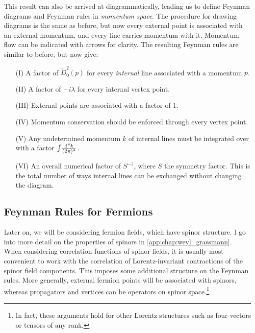\documentclass[../main.tex]{subfiles}
\begin{document}
This result can also be arrived at diagrammatically, leading us to define Feynman diagrams and Feynman rules in \emph{momentum space}.
The procedure for drawing diagrams is the same as before, but now every external point is associated with an external momentum, and every line carries momentum with it.
Momentum flow can be indicated with arrows for clarity.
The resulting Feynman rules are similar to before, but now give:
\begin{itemize}
  \item [(I)] A factor of \(\tilde{D}_0^2(p)\) for every \emph{internal} line associated with a momentum \(p\).
  \item [(II)] A factor of \(-i\lambda\) for every internal vertex point.
  \item [(III)] External points are associated with a factor of \(1\).
  \item [(IV)] Momentum conservation should be enforced through every vertex point.
  \item [(V)] Any undetermined momentum \(k\) of internal lines must be integrated over with a factor \(\int\!\frac{\mathrm{d}^{4}k}{(2\pi)^{4}}\,\).
  \item [(VI)] An overall numerical factor of \(S^{-1}\), where \(S\) the symmetry factor. This is the total number of ways internal lines can be exchanged without changing the diagram.
\end{itemize}


\subsection{Feynman Rules for Fermions}
Later on, we will be considering fermion fields, which have spinor structure.
I go into more detail on the properties of spinors in \cref{app:chap:weyl_grassmann}.
When considering correlation functions of spinor fields, it is usually most convenient to work with the correlation of Lorentz-invariant contractions of the spinor field components.
This imposes some additional structure on the Feynman rules.
More generally, external fermion points will be associated with spinors, whereas propagators and vertices can be operators on spinor space.\footnote{In fact, these arguments hold for other Lorentz structures such as four-vectors or tensors of any rank.}
\end{document}
